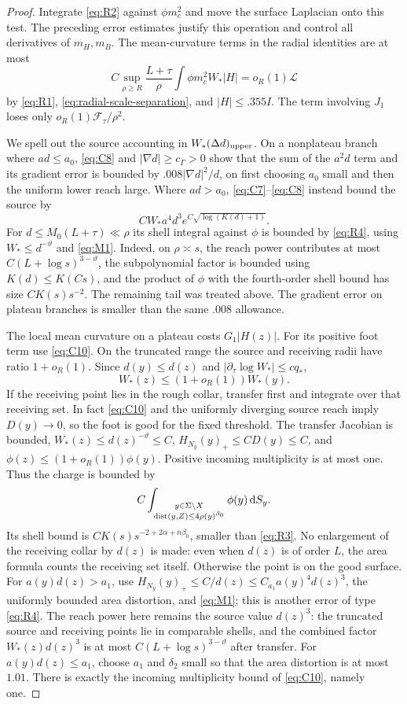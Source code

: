\begin{proof}
Integrate \eqref{eq:R2} against $\phi m_c^2$ and move the surface
Laplacian onto this test. The preceding error estimates justify this
operation and control all derivatives of $m_H,m_B$.
The mean-curvature terms in the radial identities are at most
\[
 C\sup_{\rho\ge R}\frac{L+\tau}{\rho}
 \int\phi m_c^2W_*|H|=o_R(1)\mathcal L
\]
by \eqref{eq:R1}, \eqref{eq:radial-scale-separation}, and
$|H|\le .355I$. The term involving $J_1$ loses only
$o_R(1)\mathcal F_\tau/\rho^2$.

We spell out the source accounting in $W_*(\Delta d)_{\rm upper}$.
On a nonplateau branch where $ad\le a_0$,
\eqref{eq:C8} and $|\nabla d|\ge c_\Gamma>0$ show that
the sum of the $a^2d$ term and its gradient error is bounded by
$.008|\nabla d|^2/d$, on first choosing $a_0$ small and then the
uniform lower reach large. Where $ad>a_0$,
\eqref{eq:C7}--\eqref{eq:C8} instead bound the source by
\[
 C W_*a^4d^3e^{C\sqrt{\log(K(d)+1)}}.
\]
For $d\le M_0(L+\tau)\ll\rho$ its shell integral against $\phi$
is bounded by \eqref{eq:R4}, using $W_*\le d^{-\vartheta}$ and
\eqref{eq:M1}. Indeed, on $\rho\asymp s$, the reach power contributes
at most $C(L+\log s)^{3-\vartheta}$, the subpolynomial factor is
bounded using $K(d)\le K(Cs)$, and the product of $\phi$ with the
fourth-order shell bound has size $CK(s)s^{-2}$. The remaining tail
was treated above.
The gradient error on plateau branches is smaller than the same
$.008$ allowance.

The local mean curvature on a plateau costs $G_1|H(z)|$.
For its positive foot term use \eqref{eq:C10}.
On the truncated range the source and receiving radii have ratio
$1+o_R(1)$. Since $d(y)\le d(z)$ and
$|\partial_\tau\log W_*|\le cq_*$,
\[
 W_*(z)\le(1+o_R(1))W_*(y).
\]
If the receiving point lies in the rough collar, transfer first and
integrate over that receiving set. In fact \eqref{eq:C10} and the
uniformly diverging source reach imply $D(y)\to0$, so the foot is
good for the fixed threshold. The transfer Jacobian is bounded,
$W_*(z)\le d(z)^{-\vartheta}\le C$, $H_{N_y}(y)_+\le CD(y)\le C$,
and $\phi(z)\le(1+o_R(1))\phi(y)$. Positive incoming multiplicity
is at most one. Thus the charge is bounded by
\[
 C\int_{\substack{y\in\Sigma\setminus X\\
       \operatorname{dist}(y,Z)\le4\rho(y)^{\beta_0}}}\phi(y)\,\mathrm d S_y.
\]
Its shell bound is $CK(s)s^{-2+2\alpha+n\beta_0}$, smaller than
\eqref{eq:R3}. No enlargement of the receiving collar by $d(z)$
is made: even when $d(z)$ is of order $L$, the area formula counts
the receiving set itself.
Otherwise the point is on the good surface. For
$a(y)d(z)>a_1$, use
$H_{N_y}(y)_+\le C/d(z)\le C_{a_1}a(y)^4d(z)^3$,
the uniformly bounded area distortion, and \eqref{eq:M1};
this is another error of type \eqref{eq:R4}. The reach power here
remains the source value $d(z)^3$: the truncated source and receiving
points lie in comparable shells, and the combined factor
$W_*(z)d(z)^3$ is at most $C(L+\log s)^{3-\vartheta}$ after transfer.
For $a(y)d(z)\le a_1$, choose $a_1$ and $\delta_2$ small so that
the area distortion is at most $1.01$.
There is exactly the incoming multiplicity bound of
\eqref{eq:C10}, namely one.


\end{proof}
